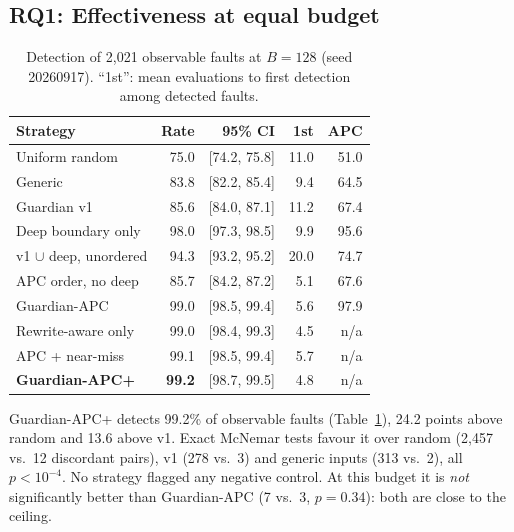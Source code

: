 \documentclass[conference]{IEEEtran}
\begin{document}
\subsection{RQ1: Effectiveness at equal budget}
\begin{table}[t]
\centering
\caption{Detection of 2{,}021 observable faults at $B=128$ (seed 20260917). ``1st'': mean evaluations to first detection among detected faults.}
\label{tab:main}
\setlength{\tabcolsep}{3.2pt}
\begin{tabular}{lrrrr}
\toprule
Strategy & Rate & 95\% CI & 1st & APC\\
\midrule
Uniform random & 75.0 & [74.2, 75.8] & 11.0 & 51.0\\
Generic & 83.8 & [82.2, 85.4] & 9.4 & 64.5\\
Guardian v1 & 85.6 & [84.0, 87.1] & 11.2 & 67.4\\
\midrule
Deep boundary only & 98.0 & [97.3, 98.5] & 9.9 & 95.6\\
v1 $\cup$ deep, unordered & 94.3 & [93.2, 95.2] & 20.0 & 74.7\\
APC order, no deep & 85.7 & [84.2, 87.2] & 5.1 & 67.6\\
Guardian-APC & 99.0 & [98.5, 99.4] & 5.6 & 97.9\\
\midrule
Rewrite-aware only & 99.0 & [98.4, 99.3] & 4.5 & n/a\\
APC + near-miss & 99.1 & [98.5, 99.4] & 5.7 & n/a\\
\textbf{Guardian-APC+} & \textbf{99.2} & [98.7, 99.5] & 4.8 & n/a\\
\bottomrule
\end{tabular}
\end{table}

Guardian-APC+ detects 99.2\% of observable faults (Table~\ref{tab:main}), 24.2 points above random and 13.6 above v1. Exact McNemar tests favour it over random (2{,}457 vs.\ 12 discordant pairs), v1 (278 vs.\ 3) and generic inputs (313 vs.\ 2), all $p<10^{-4}$. No strategy flagged any negative control. At this budget it is \emph{not} significantly better than Guardian-APC (7 vs.\ 3, $p=0.34$): both are close to the ceiling.
\end{document}
